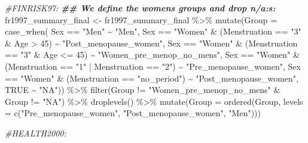 \documentclass[
]{article}
\newenvironment{Shaded}{\begin{snugshade}}{\end{snugshade}}
\newcommand{\AttributeTok}[1]{\textcolor[rgb]{0.77,0.63,0.00}{#1}}
\newcommand{\CommentTok}[1]{\textcolor[rgb]{0.56,0.35,0.01}{\textit{#1}}}
\newcommand{\ConstantTok}[1]{\textcolor[rgb]{0.00,0.00,0.00}{#1}}
\newcommand{\DecValTok}[1]{\textcolor[rgb]{0.00,0.00,0.81}{#1}}
\newcommand{\DocumentationTok}[1]{\textcolor[rgb]{0.56,0.35,0.01}{\textbf{\textit{#1}}}}
\newcommand{\FunctionTok}[1]{\textcolor[rgb]{0.00,0.00,0.00}{#1}}
\newcommand{\NormalTok}[1]{#1}
\newcommand{\OtherTok}[1]{\textcolor[rgb]{0.56,0.35,0.01}{#1}}
\newcommand{\SpecialCharTok}[1]{\textcolor[rgb]{0.00,0.00,0.00}{#1}}
\newcommand{\StringTok}[1]{\textcolor[rgb]{0.31,0.60,0.02}{#1}}
\begin{document}
\begin{Shaded}
\begin{Highlighting}[]
\CommentTok{\#FINRISK97:}
\DocumentationTok{\#\# We define the women\textquotesingle{}s groups and drop n/a:s: }
\NormalTok{fr1997\_summary\_final }\OtherTok{\textless{}{-}}\NormalTok{ fr1997\_summary\_final }\SpecialCharTok{\%\textgreater{}\%} 
  \FunctionTok{mutate}\NormalTok{(}\AttributeTok{Group =} \FunctionTok{case\_when}\NormalTok{(}
\NormalTok{    Sex }\SpecialCharTok{==} \StringTok{"Men"} \SpecialCharTok{\textasciitilde{}} \StringTok{"Men"}\NormalTok{, }
\NormalTok{    Sex }\SpecialCharTok{==} \StringTok{"Women"} \SpecialCharTok{\&}\NormalTok{ (Menstruation }\SpecialCharTok{==} \StringTok{"3"} \SpecialCharTok{\&}\NormalTok{ Age }\SpecialCharTok{\textgreater{}} \DecValTok{45}\NormalTok{) }\SpecialCharTok{\textasciitilde{}} \StringTok{"Post\_menopause\_women"}\NormalTok{,}
\NormalTok{    Sex }\SpecialCharTok{==} \StringTok{"Women"} \SpecialCharTok{\&}\NormalTok{ (Menstruation }\SpecialCharTok{==} \StringTok{"3"} \SpecialCharTok{\&}\NormalTok{ Age }\SpecialCharTok{\textless{}=} \DecValTok{45}\NormalTok{) }\SpecialCharTok{\textasciitilde{}} \StringTok{"Women\_pre\_menop\_no\_mens"}\NormalTok{,}
\NormalTok{    Sex }\SpecialCharTok{==} \StringTok{"Women"} \SpecialCharTok{\&}\NormalTok{ (Menstruation }\SpecialCharTok{==} \StringTok{"1"} \SpecialCharTok{|}\NormalTok{ Menstruation }\SpecialCharTok{==} \StringTok{"2"}\NormalTok{) }\SpecialCharTok{\textasciitilde{}} \StringTok{"Pre\_menopause\_women"}\NormalTok{,}
\NormalTok{    Sex }\SpecialCharTok{==} \StringTok{"Women"} \SpecialCharTok{\&}\NormalTok{ (Menstruation }\SpecialCharTok{==} \StringTok{"no\_period"}\NormalTok{) }\SpecialCharTok{\textasciitilde{}} \StringTok{"Post\_menopause\_women"}\NormalTok{,}
    \ConstantTok{TRUE} \SpecialCharTok{\textasciitilde{}} \StringTok{"NA"}\NormalTok{)) }\SpecialCharTok{\%\textgreater{}\%} 
  \FunctionTok{filter}\NormalTok{(Group }\SpecialCharTok{!=} \StringTok{"Women\_pre\_menop\_no\_mens"} \SpecialCharTok{\&}\NormalTok{ Group }\SpecialCharTok{!=} \StringTok{"NA"}\NormalTok{) }\SpecialCharTok{\%\textgreater{}\%} 
  \FunctionTok{droplevels}\NormalTok{() }\SpecialCharTok{\%\textgreater{}\%} 
  \FunctionTok{mutate}\NormalTok{(}\AttributeTok{Group =} \FunctionTok{ordered}\NormalTok{(Group, }\AttributeTok{levels =}  \FunctionTok{c}\NormalTok{(}\StringTok{"Pre\_menopause\_women"}\NormalTok{, }\StringTok{"Post\_menopause\_women"}\NormalTok{, }\StringTok{"Men"}\NormalTok{))) }
 
\CommentTok{\#HEALTH2000:}


\end{Highlighting}
\end{Shaded}
\end{document}

